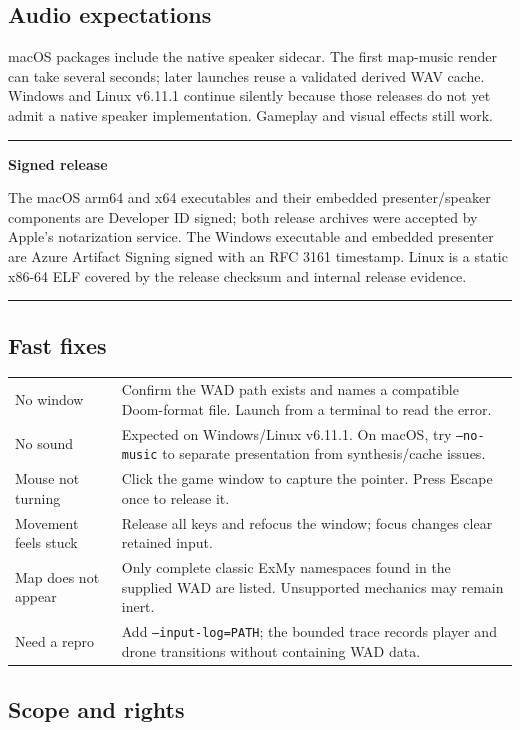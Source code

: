 \documentclass[10pt]{article}
\newenvironment{guidepanel}[2]{%
  \par\medskip
  \begingroup
  \def\GuidePanelAccent{#1}%
  \color{#1}\hrule height 1.4pt
  \vspace{5pt}%
  \color{Ink}%
  \noindent\begin{minipage}{\linewidth}
}{%
  \end{minipage}%
  \vspace{4pt}%
  \color{\GuidePanelAccent}\hrule height 0.5pt
  \endgroup
  \par\medskip
}
\begin{document}
\subsection*{Audio expectations}

macOS packages include the native speaker sidecar. The first map-music render
can take several seconds; later launches reuse a validated derived WAV cache.
Windows and Linux v6.11.1 continue silently because those releases do not yet
admit a native speaker implementation. Gameplay and visual effects still work.

\begin{guidepanel}{ShieldCyan}{PaleCyan}
\textbf{Signed release}\par
The macOS arm64 and x64 executables and their embedded presenter/speaker
components are Developer ID signed; both release archives were accepted by
Apple's notarization service. The Windows executable and embedded presenter are
Azure Artifact Signing signed with an RFC 3161 timestamp. Linux is a static
x86-64 ELF covered by the release checksum and internal release evidence.
\end{guidepanel}

\subsection*{Fast fixes}

\begin{tabularx}{\linewidth}{K Y}
No window & Confirm the WAD path exists and names a compatible Doom-format file. Launch from a terminal to read the error. \\
No sound & Expected on Windows/Linux v6.11.1. On macOS, try \texttt{--no-music} to separate presentation from synthesis/cache issues. \\
Mouse not turning & Click the game window to capture the pointer. Press Escape once to release it. \\
Movement feels stuck & Release all keys and refocus the window; focus changes clear retained input. \\
Map does not appear & Only complete classic ExMy namespaces found in the supplied WAD are listed. Unsupported mechanics may remain inert. \\
Need a repro & Add \texttt{--input-log=PATH}; the bounded trace records player and drone transitions without containing WAD data. \\
\end{tabularx}

\subsection*{Scope and rights}
\end{document}
